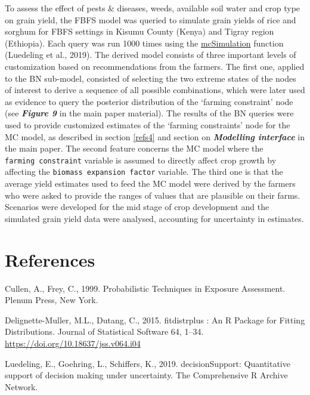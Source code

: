 \documentclass[]{elsarticle} %
\begin{document}
To assess the effect of pests \& diseases, weeds, available soil water and crop type on grain yield, the FBFS model was queried to simulate grain yields of rice and sorghum for FBFS settings in Kisumu County (Kenya) and Tigray region (Ethiopia). Each query was run 1000 times using the \href{https://www.rdocumentation.org/packages/decisionSupport/versions/1.103.8/topics/mcSimulation}{mcSimulation} function (Luedeling et al., 2019). The derived model consists of three important levels of customization based on recommendations from the farmers. The first one, applied to the BN sub-model, consisted of selecting the two extreme states of the nodes of interest to derive a sequence of all possible combinations, which were later used as evidence to query the posterior distribution of the `farming constraint' node (see \textbf{\emph{Figure 9}} in the main paper material). The results of the BN queries were used to provide customized estimates of the `farming constraints' node for the MC model, as described in section \ref{refs4} and section on \textbf{\emph{Modelling interface}} in the main paper. The second feature concerns the MC model where the \texttt{farming\ constraint} variable is assumed to directly affect crop growth by affecting the \texttt{biomass\ expansion\ factor} variable. The third one is that the average yield estimates used to feed the MC model were derived by the farmers who were asked to provide the ranges of values that are plausible on their farms. Scenarios were developed for the mid stage of crop development and the simulated grain yield data were analysed, accounting for uncertainty in estimates.

\hypertarget{references}{%
\section*{References}\label{references}}

\hypertarget{refs}{}
\leavevmode\hypertarget{ref-Cullen_and_Frey_1999}{}%
Cullen, A., Frey, C., 1999. Probabilistic Techniques in Exposure Assessment. Plenum Press, New York.

\leavevmode\hypertarget{ref-Delignette-Muller_and_Dutang_2015}{}%
Delignette-Muller, M.L., Dutang, C., 2015. fitdistrplus : An R Package for Fitting Distributions. Journal of Statistical Software 64, 1--34. \url{https://doi.org/10.18637/jss.v064.i04}

\leavevmode\hypertarget{ref-Luedeling_Goehring_et_al_2019}{}%
Luedeling, E., Goehring, L., Schiffers, K., 2019. decisionSupport: Quantitative support of decision making under uncertainty. The Comprehensive R Archive Network.
\end{document}
